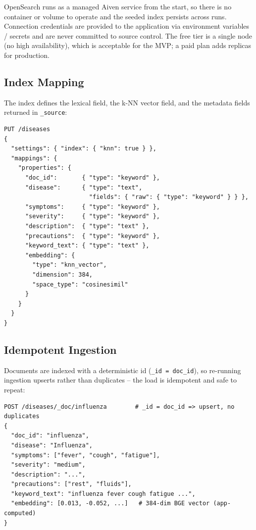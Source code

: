 \documentclass[11pt,a4paper]{article}
\begin{document}
OpenSearch runs as a managed Aiven service from the start, so there is no
container or volume to operate and the seeded index persists across runs.
Connection credentials are provided to the application via environment
variables / secrets and are never committed to source control. The free tier is
a single node (no high availability), which is acceptable for the MVP; a paid
plan adds replicas for production.

\subsection{Index Mapping}

The index defines the lexical field, the k-NN vector field, and the metadata
fields returned in \texttt{\_source}:

\begin{lstlisting}[basicstyle=\ttfamily\small]
PUT /diseases
{
  "settings": { "index": { "knn": true } },
  "mappings": {
    "properties": {
      "doc_id":       { "type": "keyword" },
      "disease":      { "type": "text",
                        "fields": { "raw": { "type": "keyword" } } },
      "symptoms":     { "type": "keyword" },
      "severity":     { "type": "keyword" },
      "description":  { "type": "text" },
      "precautions":  { "type": "keyword" },
      "keyword_text": { "type": "text" },
      "embedding": {
        "type": "knn_vector",
        "dimension": 384,
        "space_type": "cosinesimil"
      }
    }
  }
}
\end{lstlisting}

\subsection{Idempotent Ingestion}

Documents are indexed with a deterministic id (\texttt{\_id = doc\_id}), so
re-running ingestion upserts rather than duplicates -- the load is idempotent
and safe to repeat:

\begin{lstlisting}[basicstyle=\ttfamily\small]
POST /diseases/_doc/influenza        # _id = doc_id => upsert, no duplicates
{
  "doc_id": "influenza",
  "disease": "Influenza",
  "symptoms": ["fever", "cough", "fatigue"],
  "severity": "medium",
  "description": "...",
  "precautions": ["rest", "fluids"],
  "keyword_text": "influenza fever cough fatigue ...",
  "embedding": [0.013, -0.052, ...]   # 384-dim BGE vector (app-computed)
}
\end{lstlisting}
\end{document}
